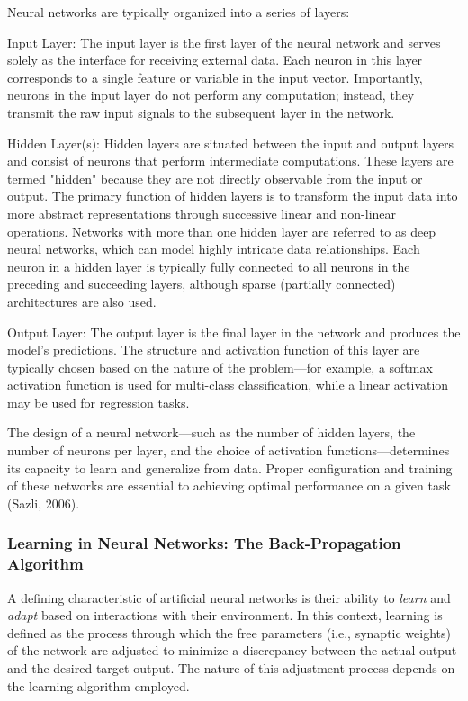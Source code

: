 Neural networks are typically organized into a series of layers:

Input Layer: The input layer is the first layer of the neural network and serves solely as the interface for receiving external data. Each neuron in this layer corresponds to a single feature or variable in the input vector. Importantly, neurons in the input layer do not perform any computation; instead, they transmit the raw input signals to the subsequent layer in the network.
    
Hidden Layer(s): Hidden layers are situated between the input and output layers and consist of neurons that perform intermediate computations. These layers are termed "hidden" because they are not directly observable from the input or output. The primary function of hidden layers is to transform the input data into more abstract representations through successive linear and non-linear operations. Networks with more than one hidden layer are referred to as deep neural networks, which can model highly intricate data relationships. Each neuron in a hidden layer is typically fully connected to all neurons in the preceding and succeeding layers, although sparse (partially connected) architectures are also used.
    
Output Layer: The output layer is the final layer in the network and produces the model's predictions. The structure and activation function of this layer are typically chosen based on the nature of the problem—for example, a softmax activation function is used for multi-class classification, while a linear activation may be used for regression tasks.

The design of a neural network—such as the number of hidden layers, the number of neurons per layer, and the choice of activation functions—determines its capacity to learn and generalize from data. Proper configuration and training of these networks are essential to achieving optimal performance on a given task (Sazli, 2006).

\subsubsection{Learning in Neural Networks: The Back-Propagation Algorithm}

A defining characteristic of artificial neural networks is their ability to \textit{learn} and \textit{adapt} based on interactions with their environment. In this context, learning is defined as the process through which the free parameters (i.e., synaptic weights) of the network are adjusted to minimize a discrepancy between the actual output and the desired target output. The nature of this adjustment process depends on the learning algorithm employed.

